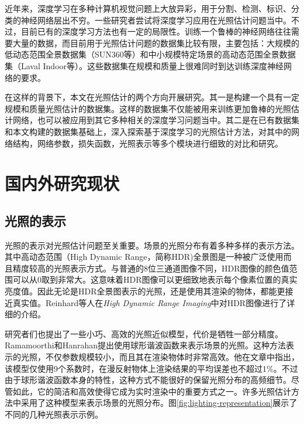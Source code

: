 近年来，深度学习在多种计算机视觉问题上大放异彩，用于分割、检测、标识、分类的神经网络层出不穷。一些研究者尝试将深度学习应用在光照估计问题当中。不过，目前已有的深度学习方法也有一定的局限性。训练一个鲁棒的神经网络往往需要大量的数据，而目前用于光照估计问题的数据集比较有限，主要包括：大规模的低动态范围全景数据集（SUN360等）和中小规模特定场景的高动态范围全景数据集（Laval Indoor等）。这些数据集在规模和质量上很难同时到达训练深度神经网络的要求。

在这样的背景下，本文在光照估计的两个方向开展研究。其一是构建一个具有一定规模和质量光照估计的数据集。这样的数据集不仅能被用来训练更加鲁棒的光照估计网络，也可以被应用到其它多种相关的深度学习问题当中。其二是在已有数据集和本文构建的数据集基础上，深入探索基于深度学习的光照估计方法，对其中的网络结构，网络参数，损失函数，光照表示等多个模块进行细致的对比和研究。

\section{国内外研究现状}
\subsection{光照的表示}
光照的表示对光照估计问题至关重要。场景的光照分布有着多种多样的表示方法。其中高动态范围（High Dynamic Range，简称HDR)全景图是一种被广泛使用而且精度较高的光照表示方式。与普通的8位三通道图像不同，HDR图像的颜色值范围可以从0取到非常大。这意味着HDR图像可以更细致地表示每个像素位置的真实亮度值。因此无论是HDR全景图表示的光照，还是使用其渲染的物体，都能更接近真实值。Reinhard等人在\textit{High Dynamic Range Imaging}\cite{reinhard2005high}中对HDR图像进行了详细的介绍。

研究者们也提出了一些小巧、高效的光照近似模型，代价是牺牲一部分精度。Ramamoorthi和Hanrahan\cite{ramamoorthi2001efficient}提出使用球形谐波函数来表示场景的光照。这种方法表示的光照，不仅参数规模较小，而且其在渲染物体时非常高效。他在文章中指出，该模型仅使用9个系数时，在漫反射物体上渲染结果的平均误差也不超过1\%。不过由于球形谐波函数本身的特性，这种方式不能很好的保留光照分布的高频细节。尽管如此，它的简洁和高效使得它成为实时渲染中的重要方式之一\cite{green2003spherical,sloan2008stupid}。许多光照估计方法中采用了这种模型来表示场景的光照分布。图\ref{fig:lighting-representation}展示了不同的几种光照表示示例。

